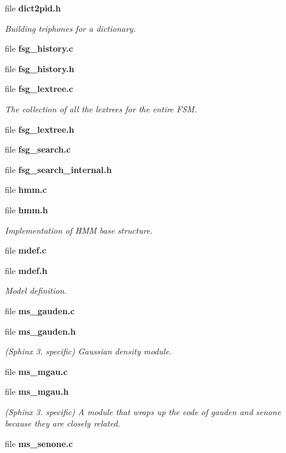 \begin{DoxyCompactItemize}
file {\bf dict2pid.\-h}
\begin{DoxyCompactList}\small\item\em Building triphones for a dictionary. \end{DoxyCompactList}\item 
file {\bfseries fsg\-\_\-history.\-c}
\item 
file {\bfseries fsg\-\_\-history.\-h}
\item 
file {\bf fsg\-\_\-lextree.\-c}
\begin{DoxyCompactList}\small\item\em The collection of all the lextrees for the entire F\-S\-M. \end{DoxyCompactList}\item 
file {\bfseries fsg\-\_\-lextree.\-h}
\item 
file {\bfseries fsg\-\_\-search.\-c}
\item 
file {\bfseries fsg\-\_\-search\-\_\-internal.\-h}
\item 
file {\bfseries hmm.\-c}
\item 
file {\bf hmm.\-h}
\begin{DoxyCompactList}\small\item\em Implementation of H\-M\-M base structure. \end{DoxyCompactList}\item 
file {\bfseries mdef.\-c}
\item 
file {\bf mdef.\-h}
\begin{DoxyCompactList}\small\item\em Model definition. \end{DoxyCompactList}\item 
file {\bfseries ms\-\_\-gauden.\-c}
\item 
file {\bf ms\-\_\-gauden.\-h}
\begin{DoxyCompactList}\small\item\em (Sphinx 3. specific) Gaussian density module. \end{DoxyCompactList}\item 
file {\bfseries ms\-\_\-mgau.\-c}
\item 
file {\bf ms\-\_\-mgau.\-h}
\begin{DoxyCompactList}\small\item\em (Sphinx 3. specific) A module that wraps up the code of gauden and senone because they are closely related. \end{DoxyCompactList}\item 
file {\bfseries ms\-\_\-senone.\-c}

\end{DoxyCompactItemize}
